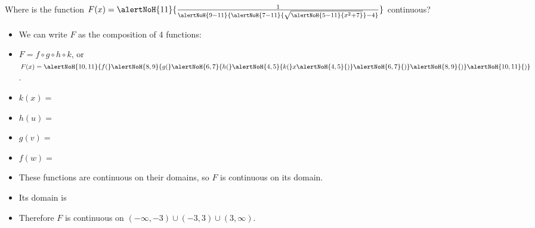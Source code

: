 \begin{frame}
\begin{example}
Where is the function $F(x) = \alertNoH{11}{\frac{1}{\alertNoH{9-11}{\alertNoH{7-11}{\sqrt{\alertNoH{5-11}{x^2+7}}} - 4}}}$ continuous?
\begin{itemize}
\item<2->  We can write $F$ as the composition of 4 functions:
\item<2->  $F = f\circ g\circ h\circ k$, or $F(x) = \alertNoH{10,11}{f (} \alertNoH{8,9}{g (} \alertNoH{6,7}{h(} \alertNoH{4,5}{k(} x\alertNoH{4,5}{)} \alertNoH{6,7}{)} \alertNoH{8,9}{)} \alertNoH{10,11}{)}$.
\item<3-| alert@4-5>  $k(x) = $ 
\item<3-| alert@6-7>  $h(u) = $ 
\item<3-| alert@8-9>  $g(v) = $ 
\item<3-| alert@10-11>  $f(w) = $ 
\item<12->  These functions are continuous on their domains, so $F$ is continuous on its domain.
\item<13->  Its domain is 
\item<15->  Therefore $F$ is continuous on $(-\infty , -3 ) \cup (-3, 3) \cup (3, \infty )$.
\end{itemize}
\end{example}
\end{frame}
